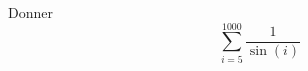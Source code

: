 \begin{exercice}\label{exotestMAT1151-G210002}

	Donner
	\[ 
		\sum_{i=5}^{1000} \frac{1}{ \sin(i) }
	\]
		

\end{exercice}
